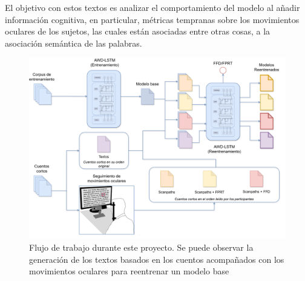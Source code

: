 El objetivo con estos textos es analizar el comportamiento del modelo al añadir información cognitiva, en particular, métricas tempranas sobre los movimientos oculares de los sujetos, las cuales están asociadas entre otras cosas, a la asociación semántica de las palabras.

\begin{figure}[H]
    \centering
    \includegraphics[width=1\textwidth]{imagenes/pipeline.png}
    \caption{Flujo de trabajo durante este proyecto. Se puede observar la generación de los textos basados en los cuentos acompañados con los movimientos oculares para reentrenar un modelo base}
    \label{fig:pipeline}
\end{figure}



